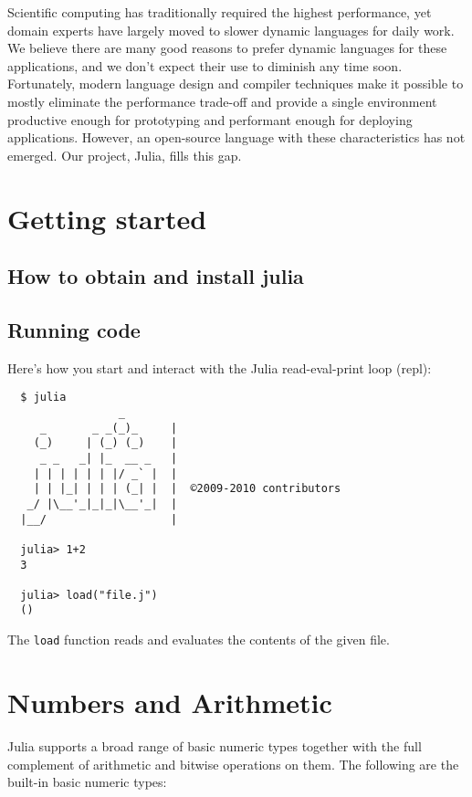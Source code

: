 \documentclass{article}
\title{\thetitle}
\author{
Jeff Bezanson \vspace{0.5em}\\
Stefan Karpinski \vspace{0.5em}\\
Viral Shah \vspace{0.5em}
}
\begin{document}
\maketitle

Scientific computing has traditionally required the highest performance,
yet domain experts have largely moved to slower dynamic languages for
daily work. We believe there are many good reasons to prefer dynamic languages
for these applications, and we don't expect their use to diminish any time
soon. Fortunately, modern language design and compiler techniques make it
possible to mostly eliminate the performance trade-off and provide a
single environment productive enough for prototyping and performant enough
for deploying applications. However, an open-source language with these
characteristics has not emerged. Our project, Julia, fills this gap.

\section{Getting started}
\subsection{How to obtain and install julia}
\subsection{Running code}

Here's how you start and interact with the Julia read-eval-print loop (repl):

\begin{verbatim}
  $ julia
                 _      
     _       _ _(_)_     |
    (_)     | (_) (_)    |  
     _ _   _| |_  __ _   |
    | | | | | | |/ _` |  |
    | | |_| | | | (_| |  |  ©2009-2010 contributors
   _/ |\__'_|_|_|\__'_|  |  
  |__/                   |

  julia> 1+2
  3

  julia> load("file.j")
  ()
\end{verbatim}
The \verb|load| function reads and evaluates the contents of the given file.

\section{Numbers and Arithmetic}
Julia supports a broad range of basic numeric types together with the full complement of arithmetic and bitwise operations on them.
The following are the built-in basic numeric types:
\end{document}
